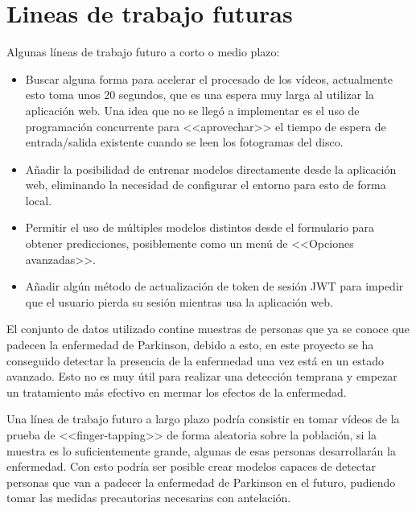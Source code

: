 \section{Lineas de trabajo futuras}

Algunas líneas de trabajo futuro a corto o medio plazo:

\begin{itemize}
    \item Buscar alguna forma para acelerar el procesado de los vídeos,
    actualmente esto toma unos 20 segundos, que es una espera muy larga al
    utilizar la aplicación web. Una idea que no se llegó a implementar es el uso
    de programación concurrente para <<aprovechar>> el tiempo de espera de
    entrada/salida existente cuando se leen los fotogramas del disco.
    \item Añadir la posibilidad de entrenar modelos directamente desde la
    aplicación web, eliminando la necesidad de configurar el entorno para esto
    de forma local.
    \item Permitir el uso de múltiples modelos distintos desde el formulario
    para obtener predicciones, posiblemente como un menú de <<Opciones
    avanzadas>>.
    \item Añadir algún método de actualización de token de sesión JWT para
    impedir que el usuario pierda su sesión mientras usa la aplicación web.
\end{itemize}

El conjunto de datos utilizado contine muestras de personas que ya se conoce que
padecen la enfermedad de Parkinson, debido a esto, en este proyecto se ha
conseguido detectar la presencia de la enfermedad una vez está en un estado
avanzado. Esto no es muy útil para realizar una detección temprana y empezar un
tratamiento más efectivo en mermar los efectos de la enfermedad.

Una línea de trabajo futuro a largo plazo podría consistir en tomar vídeos de la
prueba de <<finger-tapping>> de forma aleatoria sobre la población, si la
muestra es lo suficientemente grande, algunas de esas personas desarrollarán la
enfermedad. Con esto podría ser posible crear modelos capaces de detectar
personas que van a padecer la enfermedad de Parkinson en el futuro, pudiendo
tomar las medidas precautorias necesarias con antelación.
